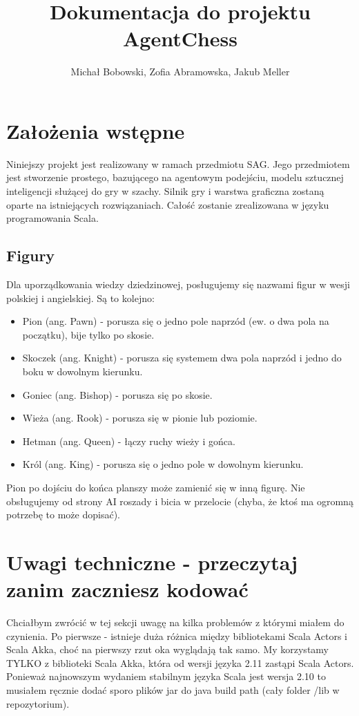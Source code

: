 \documentclass[a4paper,12pt,oneside,notitlepage,onecolumn]{article}
\author{Michał Bobowski, Zofia Abramowska, Jakub Meller}
\title{Dokumentacja do projektu AgentChess}
\begin{document}
  \maketitle
\section{Założenia wstępne}
Niniejszy projekt jest realizowany w ramach przedmiotu SAG.
Jego przedmiotem jest stworzenie prostego, bazującego na agentowym podejściu, modelu sztucznej inteligencji służącej do gry w szachy.
Silnik gry i warstwa graficzna zostaną oparte na istniejących rozwiązaniach.
Całość zostanie zrealizowana w języku programowania Scala.

\subsection{Figury}
Dla uporządkowania wiedzy dziedzinowej, posługujemy się nazwami figur w wesji polskiej i angielskiej.
Są to kolejno:
\begin{itemize}
 \item Pion (ang. Pawn) - porusza się o jedno pole naprzód (ew. o dwa pola na początku), bije tylko po skosie.
 \item Skoczek (ang. Knight) - porusza się systemem dwa pola naprzód i jedno do boku w dowolnym kierunku.
 \item Goniec (ang. Bishop) - porusza się po skosie.
 \item Wieża (ang. Rook) - porusza się w pionie lub poziomie.
 \item Hetman (ang. Queen) - łączy ruchy wieży i gońca.
 \item Król (ang. King) - porusza się o jedno pole w dowolnym kierunku.
\end{itemize}

Pion po dojściu do końca planszy może zamienić się w inną figurę.
Nie obsługujemy od strony AI roszady i bicia w przelocie (chyba, że ktoś ma ogromną potrzebę to może dopisać).

\section{Uwagi techniczne - przeczytaj zanim zaczniesz kodować}
Chciałbym zwrócić w tej sekcji uwagę na kilka problemów z którymi miałem do czynienia.
Po pierwsze - istnieje duża różnica między bibliotekami Scala Actors i Scala Akka, choć na pierwszy rzut oka wyglądają tak samo.
My korzystamy TYLKO z biblioteki Scala Akka, która od wersji języka 2.11 zastąpi Scala Actors.
Ponieważ najnowszym wydaniem stabilnym języka Scala jest wersja 2.10 to musiałem ręcznie dodać sporo plików jar do java build path (cały folder /lib w repozytorium).
\end{document}
